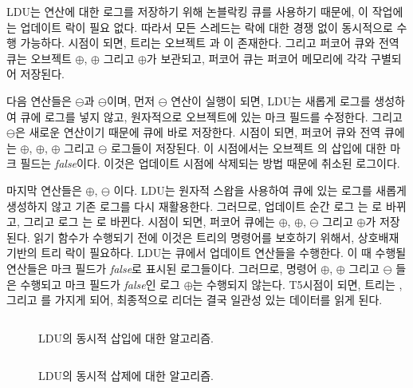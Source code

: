 LDU는 연산에 대한 로그를 저장하기 위해 논블락킹 큐를 사용하기 때문에, 
이 작업에는 업데이트 락이 필요 없다. 
따라서 모든 스레드는 락에 대한 경쟁 없이 동시적으로 수행 가능하다.
 시점이 되면, 트리는 오브젝트 과 이 존재한다.
그리고 퍼코어 큐와 전역 큐는 오브젝트 $\oplus$, $\oplus$ 그리고
$\oplus$가 보관되고, 퍼코어 큐는 퍼코어 메모리에 각각 구별되어 저장된다.

다음 연산들은 $\ominus$과 $\ominus$이며,
먼저 $\ominus$ 연산이 실행이 되면, LDU는 새롭게 로그를 생성하여 큐에 로그를 넣지 않고, 
원자적으로 오브젝트에 있는 마크 필드를 수정한다. 
그리고 $\ominus$은 새로운 연산이기 때문에 큐에 바로 저장한다. 
 시점이 되면, 퍼코어 큐와 전역 큐에는 $\oplus$, $\oplus$,
$\oplus$ 그리고 $\ominus$ 로그들이 저장된다. 
이 시점에서는 오브젝트 의 삽입에 대한 마크 필드는 \textit{false}이다. 
이것은 업데이트 시점에 삭제되는 방법 때문에 취소된 로그이다. 

마지막 연산들은 $\oplus$, $\ominus$ 이다. 
LDU는 원자적 스왑을 사용하여 큐에 있는 로그를 새롭게 생성하지 않고 기존 로그를 다시 재활용한다. 
그러므로, 업데이트 순간 로그 는 로 바뀌고, 그리고 로그 는 로
바뀐다.
 시점이 되면, 퍼코어 큐에는 $\oplus$, $\oplus$,
$\ominus$ 그리고 $\oplus$가 저장된다. 
읽기 함수가 수행되기 전에 이것은 트리의 명령어를 보호하기 위해서, 상호배재 기반의 트리 락이 필요하다. 
LDU는 큐에서 업데이트 연산들을 수행한다. 
이 때 수행될 연산들은 마크 필드가 \textit{false}로 표시된 로그들이다.
그러므로, 명령어 $\oplus$, $\oplus$ 그리고 $\ominus$
들은 수행되고  마크 필드가 \textit{false}인 로그 $\oplus$는 수행되지 않는다. 
T5시점이 되면, 트리는 ,  그리고 를 가지게 되어, 
최종적으로 리더는 결국 일관성 있는 데이터를 읽게 된다. 

\begin{figure}[h!]
\begin{center}
\inputminted[linenos,fontsize=\footnotesize, tabsize=4]{c}{src/ldu_logical_a.c}
\end{center}
\caption{LDU의 동시적 삽입에 대한 알고리즘.}
\label{fig:gldulogicalupdate}
\end{figure}


\begin{figure}[h!]
\begin{center}
\inputminted[linenos,fontsize=\footnotesize, tabsize=4]{c}{src/ldu_logical_b.c}
\end{center}
\caption{LDU의 동시적 삽제에 대한 알고리즘.}
\label{fig:gldulogicalupdate}
\end{figure}



